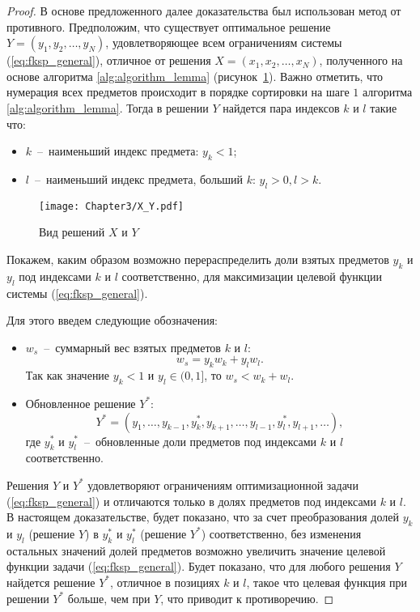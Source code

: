 \begin{proof}

В основе предложенного далее доказательства был использован метод от противного. Предположим, что существует оптимальное решение $Y = (y_1, y_2, \ldots, y_N)$, удовлетворяющее всем ограничениям системы (\ref{eq:fksp_general}), отличное от решения $X = (x_1, x_2, \ldots, x_N)$, полученного на основе алгоритма \ref{alg:algorithm_lemma} (рисунок~\ref{fig:X_Y_Solutions}). Важно отметить, что нумерация всех предметов происходит в порядке сортировки на шаге $1$ алгоритма \ref{alg:algorithm_lemma}. Тогда в решении $Y$ найдется пара индексов $k$ и $l$ такие что:
\begin{itemize}
	\item $k$~--~наименьший индекс предмета: $y_k < 1$;
	\item $l$~--~наименьший индекс предмета, больший $k$: $y_l > 0, l>k$.
\end{itemize}

\begin{figure}[htbp]
\begin{center}
\texttt{[image: Chapter3/X\_Y.pdf]}
\caption{Вид решений $X$ и $Y$}
\label{fig:X_Y_Solutions}
\end{center}
\end{figure}

Покажем, каким образом возможно перераспределить доли взятых предметов $y_k$ и $y_l$ под индексами $k$ и $l$ соответственно, для максимизации целевой функции системы (\ref{eq:fksp_general}).

Для этого введем следующие обозначения:
\begin{itemize}
	\item $w_{s}$~--~суммарный вес взятых предметов $k$ и $l$: $$w_{s} = y_k w_k + y_l w_l.$$ Так как значение $y_k < 1$ и $y_l \in (0, 1]$, то $w_{s} < w_k + w_l$.
	\item Обновленное решение $Y^{*}$: $$Y^{*}=(y_1, \ldots, y_{k-1}, y_k^{*}, y_{k+1}, \ldots, y_{l-1}, y_l^{*}, y_{l+1}, \ldots),$$ где $y_k^{*}$ и $y_l^{*}$~--~обновленные доли предметов под индексами $k$ и $l$ соответственно.
\end{itemize}

Решения $Y$ и $Y^{*}$ удовлетворяют ограничениям оптимизационной задачи (\ref{eq:fksp_general}) и отличаются только в долях предметов под индексами $k$ и $l$. В настоящем доказательстве, будет показано, что за счет преобразования долей $y_k$ и $y_l$ (решение $Y$) в $y_k^{*}$ и $y_l^{*}$ (решение $Y^{*}$) соответственно, без изменения остальных значений долей предметов возможно увеличить значение целевой функции задачи (\ref{eq:fksp_general}). Будет показано, что для любого решения $Y$ найдется решение $Y^{*}$, отличное в позициях $k$ и $l$, такое что целевая функция при решении $Y^{*}$ больше, чем при $Y$, что приводит к противоречию.


\end{proof}
